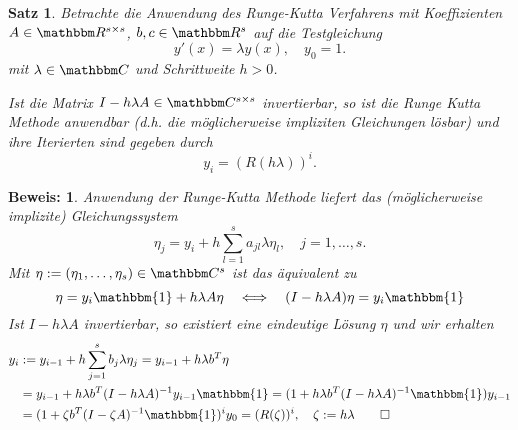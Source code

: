 \documentclass[12pt,a4paper]{book}
\theoremstyle{break}
\newtheorem{theorem}{Satz}[chapter]
\theoremstyle{nonumberplain}
\newtheorem{beweis}{Beweis:}
\newcommand{\C}{\mathbbm C}
\newcommand{\R}{\mathbbm R}
\newcommand{\1}{\mathbbm{1}} 			      	%
\begin{document}
\begin{theorem}\label{thm:R_for_RK}
Betrachte die Anwendung des Runge-Kutta Verfahrens mit Koeffizienten $A\in \R^{s\times s}$, $b,c\in \R^s$ 
auf die Testgleichung
\[
y'(x)=\lambda y(x), \quad y_0=1. 
\]
mit $\lambda\in \C$ und Schrittweite $h>0$.

Ist die Matrix $I-h \lambda A\in \C^{s\times s}$ invertierbar, so ist die Runge Kutta Methode 
anwendbar (d.h. die möglicherweise impliziten Gleichungen lösbar) und ihre Iterierten sind gegeben durch
\[
y_i=(R(h\lambda))^i.
\]
\end{theorem}
\begin{beweis}
Anwendung der Runge-Kutta Methode liefert das (möglicherweise implizite) Gleichungssystem
\[
\eta_j = y_i + h \sum_{l=1}^s a_{jl} \lambda \eta_l, \quad j=1,\ldots,s.
\]
Mit $\eta:=(\eta_1,\ldots,\eta_s)\in \C^s$ ist das äquivalent zu 
\[
\eta = y_i \1 + h\lambda A \eta \quad \Longleftrightarrow \quad (I-h\lambda A )\eta = y_i \1
\]
Ist $I-h \lambda A$ invertierbar, so existiert eine eindeutige Lösung $\eta$ und wir erhalten
\begin{align*}
y_{i}&:=y_{i-1} +  h \sum_{j=1}^s b_j \lambda \eta_j= y_{i-1} + h \lambda b^T \eta\\
&= y_{i-1} + h \lambda b^T (I-h\lambda A )^{-1} y_{i-1} \1 
= (1+h \lambda b^T (I-h\lambda A )^{-1} \1)y_{i-1}\\
&= (1+\zeta b^T (I- \zeta A )^{-1} \1)^{i} y_0=(R(\zeta))^i, \quad \zeta:=h\lambda\qquad \Box
\end{align*}
\end{beweis}
\end{document}
